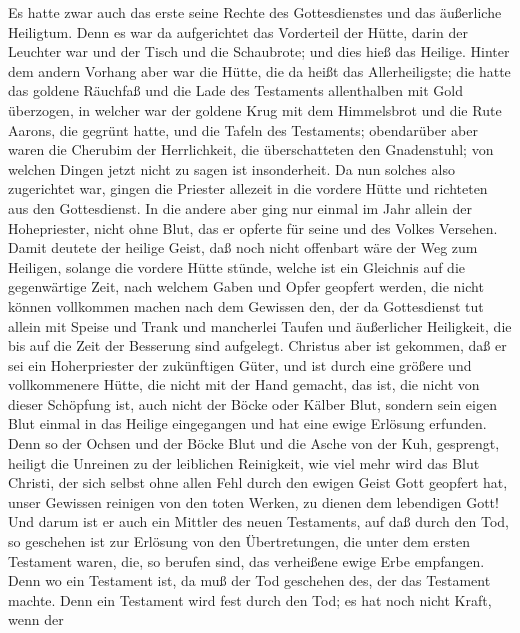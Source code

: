 Es hatte zwar auch das erste seine Rechte des
Gottesdienstes und das äußerliche Heiligtum.  Denn es war da
aufgerichtet das Vorderteil der Hütte, darin der Leuchter war und der
Tisch und die Schaubrote; und dies hieß das Heilige.  Hinter
dem andern Vorhang aber war die Hütte, die da heißt das Allerheiligste;
 die hatte das goldene Räuchfaß und die Lade des Testaments
allenthalben mit Gold überzogen, in welcher war der goldene Krug mit dem
Himmelsbrot und die Rute Aarons, die gegrünt hatte, und die Tafeln des
Testaments;  obendarüber aber waren die Cherubim der
Herrlichkeit, die überschatteten den Gnadenstuhl; von welchen Dingen
jetzt nicht zu sagen ist insonderheit.  Da nun solches also
zugerichtet war, gingen die Priester allezeit in die vordere Hütte und
richteten aus den Gottesdienst.  In die andere aber ging nur
einmal im Jahr allein der Hohepriester, nicht ohne Blut, das er opferte
für seine und des Volkes Versehen.  Damit deutete der
heilige Geist, daß noch nicht offenbart wäre der Weg zum Heiligen,
solange die vordere Hütte stünde,  welche ist ein Gleichnis
auf die gegenwärtige Zeit, nach welchem Gaben und Opfer geopfert werden,
die nicht können vollkommen machen nach dem Gewissen den, der da
Gottesdienst tut  allein mit Speise und Trank und
mancherlei Taufen und äußerlicher Heiligkeit, die bis auf die Zeit der
Besserung sind aufgelegt.  Christus aber ist gekommen, daß
er sei ein Hoherpriester der zukünftigen Güter, und ist durch eine
größere und vollkommenere Hütte, die nicht mit der Hand gemacht, das
ist, die nicht von dieser Schöpfung ist,  auch nicht der
Böcke oder Kälber Blut, sondern sein eigen Blut einmal in das Heilige
eingegangen und hat eine ewige Erlösung erfunden.  Denn so
der Ochsen und der Böcke Blut und die Asche von der Kuh, gesprengt,
heiligt die Unreinen zu der leiblichen Reinigkeit,  wie
viel mehr wird das Blut Christi, der sich selbst ohne allen Fehl durch
den ewigen Geist Gott geopfert hat, unser Gewissen reinigen von den
toten Werken, zu dienen dem lebendigen Gott!  Und darum ist
er auch ein Mittler des neuen Testaments, auf daß durch den Tod, so
geschehen ist zur Erlösung von den Übertretungen, die unter dem ersten
Testament waren, die, so berufen sind, das verheißene ewige Erbe
empfangen.  Denn wo ein Testament ist, da muß der Tod
geschehen des, der das Testament machte.  Denn ein
Testament wird fest durch den Tod; es hat noch nicht Kraft, wenn der
